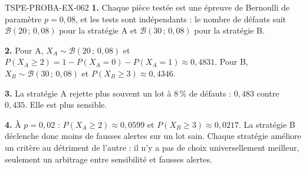 \begin{corrige}{TSPE-PROBA-EX-062}
\textbf{1.} Chaque pièce testée est une épreuve de Bernoulli de paramètre
$p=0{,}08$, et les tests sont indépendants : le nombre de défauts suit
$\mathcal{B}(20\,;\,0{,}08)$ pour la stratégie A et
$\mathcal{B}(30\,;\,0{,}08)$ pour la stratégie B.

\textbf{2.} Pour A, $X_A\sim\mathcal{B}(20\,;\,0{,}08)$ et
$P(X_A\geq2)=1-P(X_A=0)-P(X_A=1)\approx0{,}4831$. Pour B,
$X_B\sim\mathcal{B}(30\,;\,0{,}08)$ et
$P(X_B\geq3)\approx0{,}4346$.

\textbf{3.} La stratégie A rejette plus souvent un lot à $8\,\%$ de défauts :
$0{,}483$ contre $0{,}435$. Elle est plus sensible.

\textbf{4.} À $p=0{,}02$ : $P(X_A\geq2)\approx0{,}0599$ et
$P(X_B\geq3)\approx0{,}0217$. La stratégie B déclenche donc moins de fausses
alertes sur un lot sain. Chaque stratégie améliore un critère au détriment de
l'autre : il n'y a pas de choix universellement meilleur, seulement un
arbitrage entre sensibilité et fausses alertes.
\end{corrige}
